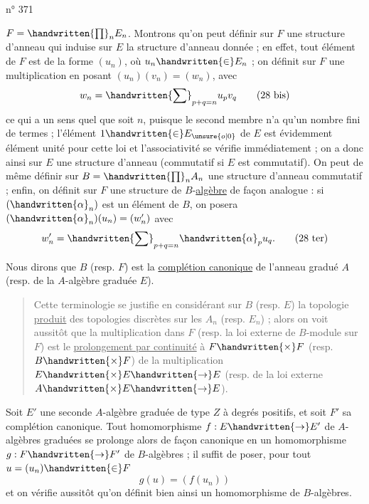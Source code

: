 \begin{flushright}n° 371\end{flushright}

$F=\handwritten{\prod}_{n}E_n$. Montrons qu'on peut définir sur $F$ une structure d'anneau qui induise sur $E$ la structure d'anneau donnée ; en effet, tout élément de $F$ est de la forme $(u_n)$, où $u_n\handwritten{\in}E_n$ ; on définit sur $F$ une multiplication en posant $(u_n)(v_n)=(w_n)$, avec
\[
w_n=\handwritten{\sum}_{p+q=n}u_pv_q
\tag*{(28 bis)}
\]
ce qui a un sens quel que soit $n$, puisque le second membre n'a qu'un nombre fini de termes ; l'élément $1\handwritten{\in}E_{\unsure{o|0}}$ de $E$ est évidemment élément unité pour cette loi et l'associativité se vérifie immédiatement ; on a donc ainsi sur $E$ une structure d'anneau (commutatif si $E$ est commutatif). On peut de même définir sur $B=\handwritten{\prod}_{n}A_n$ une structure d'anneau commutatif ; enfin, on définit sur $F$ une structure de $B$-\uline{algèbre} de façon analogue : si $(\handwritten{\alpha}_n)$ est un élément de $B$, on posera $(\handwritten{\alpha}_n)(u_n)=(w'_n)$ avec
\[
w'_n=\handwritten{\sum}_{p+q=n}\handwritten{\alpha}_pu_q.
\tag*{(28 ter)}
\]

Nous dirons que $B$ (resp. $F$) est la \uline{complétion canonique} de l'anneau gradué $A$ (resp. de la $A$-algèbre graduée $E$).

\begin{quote}
\handwritten{*}Cette terminologie se justifie en considérant sur $B$ (resp. $E$) la topologie \uline{produit} des topologies discrètes sur les $A_n$ (resp. $E_n$) ; alors on voit aussitôt que la multiplication dans $F$ (resp. la loi externe de $B$-module sur $F$) est le \uline{prolongement par continuité} à $F\handwritten{\times}F$ (resp. $B\handwritten{\times}F$) de la multiplication $E\handwritten{\times}E\handwritten{\to}E$ (resp. de la loi externe $A\handwritten{\times}E\handwritten{\to}E$).\handwritten{*}
\end{quote}

Soit $E'$ une seconde $A$-algèbre graduée de type $Z$ à degrés positifs, et soit $F'$ sa complétion canonique. Tout homomorphisme $f:E\handwritten{\to}E'$ de $A$-algèbres graduées se prolonge alors de façon canonique en un homomorphisme $g:F\handwritten{\to}F'$ de $B$-algèbres ; il suffit de poser, pour tout $u=(u_n)\handwritten{\in}F$
\[
g(u)=(f(u_n))
\]
et on vérifie aussitôt qu'on définit bien ainsi un homomorphisme de $B$-algèbres.
